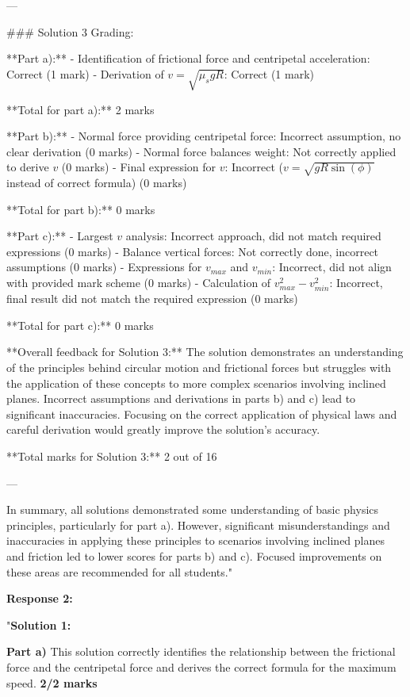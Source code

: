 \documentclass[a4paper,11pt]{article}
\begin{document}
---

### Solution 3 Grading:

**Part a):**
- Identification of frictional force and centripetal acceleration: Correct (1 mark)
- Derivation of \(v = \sqrt{\mu_s g R}\): Correct (1 mark)
  
**Total for part a):** 2 marks

**Part b):**
- Normal force providing centripetal force: Incorrect assumption, no clear derivation (0 marks)
- Normal force balances weight: Not correctly applied to derive \(v\) (0 marks)
- Final expression for \(v\): Incorrect (\(v = \sqrt{g R \sin(\phi)}\) instead of correct formula) (0 marks)
  
**Total for part b):** 0 marks

**Part c):**
- Largest \(v\) analysis: Incorrect approach, did not match required expressions (0 marks)
- Balance vertical forces: Not correctly done, incorrect assumptions (0 marks)
- Expressions for \(v_{max}\) and \(v_{min}\): Incorrect, did not align with provided mark scheme (0 marks)
- Calculation of \(v_{max}^2 - v_{min}^2\): Incorrect, final result did not match the required expression (0 marks)
  
**Total for part c):** 0 marks

**Overall feedback for Solution 3:** The solution demonstrates an understanding of the principles behind circular motion and frictional forces but struggles with the application of these concepts to more complex scenarios involving inclined planes. Incorrect assumptions and derivations in parts b) and c) lead to significant inaccuracies. Focusing on the correct application of physical laws and careful derivation would greatly improve the solution's accuracy.

**Total marks for Solution 3:** 2 out of 16

---

In summary, all solutions demonstrated some understanding of basic physics principles, particularly for part a). However, significant misunderstandings and inaccuracies in applying these principles to scenarios involving inclined planes and friction led to lower scores for parts b) and c). Focused improvements on these areas are recommended for all students."

\textbf{Response 2:}

"\textbf{Solution 1:}

\textbf{Part a)} This solution correctly identifies the relationship between the frictional force and the centripetal force and derives the correct formula for the maximum speed. \textbf{2/2 marks}
\end{document}
